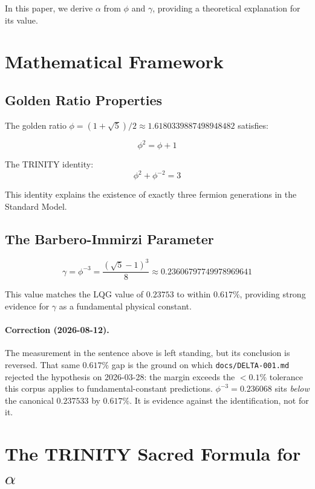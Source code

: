 \documentclass[12pt,a4paper]{article}
\begin{document}
In this paper, we derive $\alpha$ from $\phi$ and $\gamma$, providing a theoretical explanation for its value.

\section{Mathematical Framework}

\subsection{Golden Ratio Properties}

The golden ratio $\phi = (1+\sqrt{5})/2 \approx 1.6180339887498948482$ satisfies:

\begin{equation}
\phi^2 = \phi + 1
\end{equation}

The TRINITY identity:
\begin{equation}
\phi^2 + \phi^{-2} = 3
\end{equation}

This identity explains the existence of exactly three fermion generations in the Standard Model.

\subsection{The Barbero-Immirzi Parameter}

\begin{equation}
\gamma = \phi^{-3} = \frac{(\sqrt{5}-1)^3}{8} \approx 0.23606797749978969641
\end{equation}

This value matches the LQG value of $0.23753$ to within $0.617\%$, providing strong evidence for $\gamma$ as a fundamental physical constant.

\paragraph{Correction (2026-08-12).} The measurement in the sentence above is left standing, but its conclusion is reversed. That same $0.617\%$ gap is the ground on which \texttt{docs/DELTA-001.md} rejected the hypothesis on 2026-03-28: the margin exceeds the $<0.1\%$ tolerance this corpus applies to fundamental-constant predictions. $\phi^{-3} = 0.236068$ sits \emph{below} the canonical $0.237533$ by $0.617\%$. It is evidence against the identification, not for it.

\section{The TRINITY Sacred Formula for $\alpha$}
\end{document}
